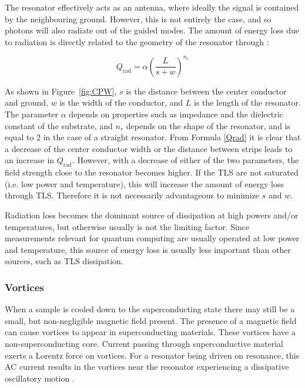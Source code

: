       The resonator effectively acts as an antenna, where ideally the signal is contained by the neighbouring ground. However, this is not entirely the case, and so photons will also radiate out of the guided modes. The amount of energy loss due to radiation is directly related to the geometry of the resonator through \cite{sage2011study,Mazin}:

      \begin{equation}
          Q_\text{rad} = \alpha \left( \frac{L}{s + w}\right)^{n_r}
          \label{Qrad}
      \end{equation}

      As shown in Figure~\ref{fig:CPW}, $s$ is the distance between the center conductor and ground, $w$ is the width of the conductor, and $L$ is the length of the resonator. The parameter $\alpha$ depends on properties such as impedance and the dielectric constant of the substrate, and $n_r$ depends on the shape of the resonator, and is equal to 2 in the case of a straight resonator. From Formula \ref{Qrad} it is clear that a decrease of the center conductor width or the distance between strips leads to an increase in $Q_\text{rad}$. However, with a decrease of either of the two parameters, the field strength close to the resonator becomes higher. If the TLS are not saturated (i.e. low power and temperature), this will increase the amount of energy loss through TLS. Therefore it is not necessarily advantageous to minimize $s$ and $w$.

      Radiation loss becomes the dominant source of dissipation at high powers and/or temperatures, but otherwise usually is not the limiting factor. Since measurements relevant for quantum computing are usually operated at low power and temperature, this source of energy loss is usually less important than other sources, such as TLS dissipation.

    \subsubsection{Vortices}

      When a sample is cooled down to the superconducting state there may still be a small, but non-negligible magnetic field present. The presence of a magnetic field can cause vortices to appear in superconducting materials. These vortices have a non-superconducting core. Current passing through superconductive material exerts a Lorentz force on vortices. For a resonator being driven on resonance, this AC current results in the vortices near the resonator experiencing a dissipative oscillatory motion \cite{plourde2009microwave}.

